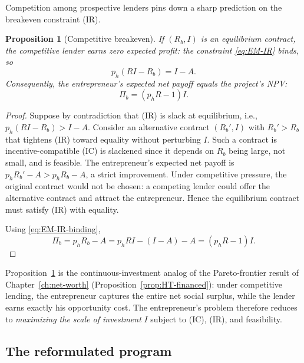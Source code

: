 \documentclass[11pt,a4paper,oneside]{book}
\theoremstyle{plain}
\newtheorem{proposition}[theorem]{Proposition}
\theoremstyle{definition}
\theoremstyle{remark}
\numberwithin{equation}{chapter}
\begin{document}
Competition among prospective lenders pins down a sharp prediction on the breakeven constraint (IR).

\begin{proposition}[Competitive breakeven]\label{prop:EM-breakeven}
If $(R_b, I)$ is an equilibrium contract, the competitive lender earns zero expected profit: the constraint \eqref{eq:EM-IR} binds, so
\begin{equation}\label{eq:EM-IR-binding}
  p_h (R I - R_b) = I - A.
\end{equation}
Consequently, the entrepreneur's expected net payoff equals the project's NPV:
\begin{equation}\label{eq:EM-net-payoff-NPV}
  \Pi_b = (p_h R - 1) I.
\end{equation}
\end{proposition}

\begin{proof}
Suppose by contradiction that (IR) is slack at equilibrium, i.e., $p_h(R I - R_b) > I - A$.
Consider an alternative contract $(R_b', I)$ with $R_b' > R_b$ that tightens (IR) toward equality without perturbing $I$.
Such a contract is incentive-compatible (IC) is slackened since it depends on $R_b$ being large, not small, and is feasible.
The entrepreneur's expected net payoff is $p_h R_b' - A > p_h R_b - A$, a strict improvement.
Under competitive pressure, the original contract would not be chosen: a competing lender could offer the alternative contract and attract the entrepreneur.
Hence the equilibrium contract must satisfy (IR) with equality.

Using \eqref{eq:EM-IR-binding},
\begin{equation*}
  \Pi_b = p_h R_b - A = p_h R I - (I - A) - A = (p_h R - 1) I.
\end{equation*}
\end{proof}

Proposition~\ref{prop:EM-breakeven} is the continuous-investment analog of the Pareto-frontier result of Chapter~\ref{ch:net-worth} (Proposition~\ref{prop:HT-financed}): under competitive lending, the entrepreneur captures the entire net social surplus, while the lender earns exactly his opportunity cost.
The entrepreneur's problem therefore reduces to \emph{maximizing the scale of investment} $I$ subject to (IC), (IR), and feasibility.

\subsection{The reformulated program}
\end{document}
